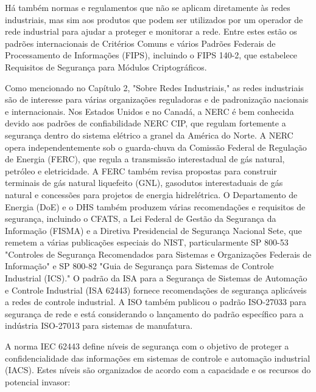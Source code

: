 Há também normas e regulamentos que não se aplicam diretamente às redes industriais, mas sim aos produtos que podem ser utilizados por um operador de rede industrial para ajudar a proteger e monitorar a rede. Entre estes estão os padrões internacionais de Critérios Comuns e vários Padrões Federais de Processamento de Informações (FIPS), incluindo o FIPS 140-2, que estabelece Requisitos de Segurança para Módulos Criptográficos.

Como mencionado no Capítulo 2, "Sobre Redes Industriais," as redes industriais são de interesse para várias organizações reguladoras e de padronização nacionais e internacionais. Nos Estados Unidos e no Canadá, a NERC é bem conhecida devido aos padrões de confiabilidade NERC CIP, que regulam fortemente a segurança dentro do sistema elétrico a granel da América do Norte. A NERC opera independentemente sob o guarda-chuva da Comissão Federal de Regulação de Energia (FERC), que regula a transmissão interestadual de gás natural, petróleo e eletricidade. A FERC também revisa propostas para construir terminais de gás natural liquefeito (GNL), gasodutos interestaduais de gás natural e concessões para projetos de energia hidrelétrica. O Departamento de Energia (DoE) e o DHS também produzem várias recomendações e requisitos de segurança, incluindo o CFATS, a Lei Federal de Gestão da Segurança da Informação (FISMA) e a Diretiva Presidencial de Segurança Nacional Sete, que remetem a várias publicações especiais do NIST, particularmente SP 800-53 "Controles de Segurança Recomendados para Sistemas e Organizações Federais de Informação" e SP 800-82 "Guia de Segurança para Sistemas de Controle Industrial (ICS)." O padrão da ISA para a Segurança de Sistemas de Automação e Controle Industrial (ISA 62443) fornece recomendações de segurança aplicáveis a redes de controle industrial. A ISO também publicou o padrão ISO-27033 para segurança de rede e está considerando o lançamento do padrão específico para a indústria ISO-27013 para sistemas de manufatura.

A norma IEC 62443 define níveis de segurança com o objetivo de proteger a confidencialidade das informações em sistemas de controle e automação industrial (IACS). Estes níveis são organizados de acordo com a capacidade e os recursos do potencial invasor:

